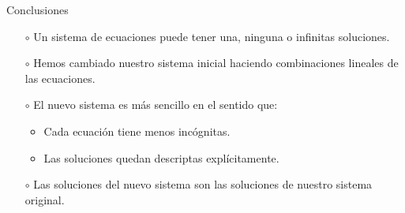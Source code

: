 \documentclass[handout]{beamer} %
\renewcommand{\_}[1]{_{\left( #1 \right)}}
\renewcommand{\^}[1]{^{\left( #1 \right)}}
\begin{document}
\begin{frame}{Conclusiones}
	 \pause
	\begin{itemize}
		\item[$\circ$]Un sistema de ecuaciones puede tener una, ninguna o infinitas soluciones. \pause
		
		\item[$\circ$]Hemos cambiado nuestro sistema inicial haciendo combinaciones lineales de las ecuaciones. \pause
		
		\item[$\circ$]El nuevo sistema es más sencillo en el sentido que: \pause
		\begin{itemize}
			\item Cada ecuación tiene menos incógnitas.
			\item Las soluciones quedan descriptas explícitamente.
		\end{itemize}
		 \pause
		\item[$\circ$]Las soluciones del nuevo sistema son las soluciones de nuestro sistema original.
		
	\end{itemize}
\end{frame}
\end{document}
